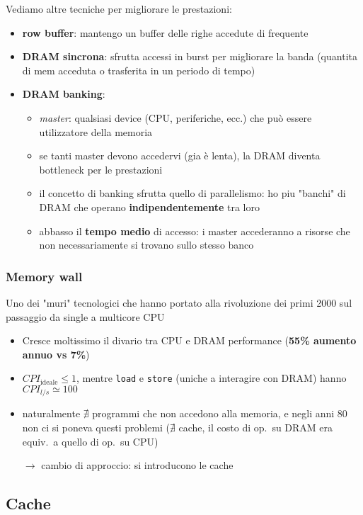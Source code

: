 Vediamo altre tecniche per migliorare le prestazioni:
\begin{itemize}
  \item \textbf{row buffer}: mantengo un buffer delle righe accedute di frequente
  \item \textbf{DRAM sincrona}: sfrutta accessi in burst per migliorare la banda (quantita di mem acceduta o trasferita in un periodo di tempo)
  \item \textbf{DRAM banking}: 
    \begin{itemize}
      \item \textit{master}: qualsiasi device (CPU, periferiche, ecc.) che pu\`o essere utilizzatore della memoria
      \item se tanti master devono accedervi (gia \`e lenta), la DRAM diventa bottleneck per le prestazioni
      \item il concetto di banking sfrutta quello di parallelismo: ho piu "banchi" di DRAM che operano \textbf{indipendentemente} tra loro
      \item abbasso il \textbf{tempo medio} di accesso: i master accederanno a risorse che non necessariamente si trovano sullo stesso banco
    \end{itemize}  
\end{itemize}

\subsubsection{Memory wall}

Uno dei "muri" tecnologici che hanno portato alla rivoluzione dei primi 2000 sul passaggio da single a multicore CPU
\begin{itemize}
  \item Cresce moltissimo il divario tra CPU e DRAM performance (\textbf{55\% aumento annuo vs 7\%})
  \item $CPI_{\text{ideale}} \leq 1$, mentre \lstinline|load| e \lstinline|store| (uniche a interagire con DRAM) hanno $CPI_{l/s} \simeq 100$
  \item naturalmente $\nexists$ programmi che non accedono alla memoria, e negli anni 80 non ci si poneva questi problemi ($\nexists$ cache, il costo di op.~su DRAM era equiv.~a quello di op.~su CPU)
  \item[$\rightarrow$] cambio di approccio: si introducono le cache
\end{itemize}

\subsection{Cache}


